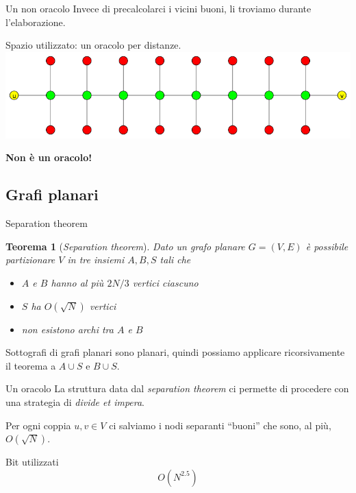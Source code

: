 \documentclass{beamer}
\newcounter{counter1}
\theoremstyle{plain}
\newtheorem{myteo}[counter1]{Teorema}
\theoremstyle{definition}
\theoremstyle{remark}
\newcommand{\pa}[1]{\left(#1\right)}
\begin{document}
\begin{frame}{Un non oracolo}
  Invece di precalcolarci i vicini buoni, li troviamo durante
  l'elaborazione.
  
  Spazio utilizzato: un oracolo per distanze.
  \vfill
  \pause
  \includegraphics[width=\textwidth]{millepiedi}
  
  \begin{center}
    \textbf{Non \`e un oracolo!}
  \end{center}
\end{frame}

\subsection{Grafi planari}

\begin{frame}{Separation theorem}
  \begin{myteo}[\textit{Separation theorem}]
    Dato un grafo planare $G = (V,E)$ \`e possibile partizionare $V$
    in tre insiemi $A,B,S$ tali che
    \begin{itemize}
    \item $A$ e $B$ hanno al pi\`u $2N/3$ vertici ciascuno
    \item $S$ ha $O\pa{ \sqrt{N}}$ vertici
    \item non esistono archi tra $A$ e $B$
    \end{itemize}
  \end{myteo}
  \vfill
  \pause
  Sottografi di grafi planari sono planari, quindi possiamo applicare
  ricorsivamente il teorema a $A\cup S$ e $B\cup S$.
\end{frame}

\begin{frame}{Un oracolo}
  La struttura data dal \textit{separation theorem} ci permette di
  procedere con una strategia di \textit{divide et impera}.
  \vfill \pause

  Per ogni coppia $u,v\in V$ ci salviamo i nodi separanti ``buoni''
  che sono, al pi\`u, $O\pa{\sqrt{N}}$.
  \vfill \pause

  \begin{block}{Bit utilizzati}
    \[ O \pa{N^{2.5}} \]
  \end{block}
\end{frame}
\end{document}
